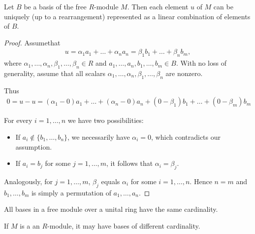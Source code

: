 \begin{proposition}\label{def:module_basis_decomposition}
  Let $B$ be a basis of the free $R$-module $M$. Then each element $u$ of $M$ can be uniquely (up to a rearrangement) represented as a linear combination of elements of $B$.
\end{proposition}
\begin{proof}
  Assume\LEM that
  \begin{align*}
    u = \alpha_1 a_1 + \ldots + \alpha_n a_n = \beta_1 b_1 + \ldots + \beta_n b_m,
  \end{align*}
  where $\alpha_1, \ldots, \alpha_n, \beta_1, \ldots, \beta_n \in R$ and $a_1, \ldots, a_n, b_1, \ldots, b_m \in B$. With no loss of generality, assume that all scalars $\alpha_1, \ldots, \alpha_n, \beta_1, \ldots, \beta_n$ are nonzero.

  Thus
  \begin{align*}
    0 = u - u = (\alpha_1 - 0) a_1 + \ldots + (\alpha_n - 0) a_n + (0 - \beta_1) b_1 + \ldots + (0 - \beta_m) b_m
  \end{align*}

  For every $i = 1, \ldots, n$ we have two possibilities:
  \begin{itemize}
    \item If $a_i \not\in \{ b_1, \ldots, b_n \}$, we necessarily have $\alpha_i = 0$, which contradicts our assumption.
    \item If $a_i = b_j$ for some $j = 1, \ldots, m$, it follows that $\alpha_i = \beta_j$.
  \end{itemize}

  Analogously, for $j = 1, \ldots, m$, $\beta_j$ equals $\alpha_i$ for some $i = 1, \ldots, n$. Hence $n = m$ and $b_1, \ldots, b_m$ is simply a permutation of $a_1, \ldots, a_n$.
\end{proof}

\begin{proposition}\label{thm:free_module_basis_cardinality}\cite{ProofWiki:bases_of_free_module_have_same_cardinality}
  All bases in a free module over a unital ring have the same cardinality.
\end{proposition}

\begin{example}\label{ex:free_module_with_non_equinumerous_bases}
  If $M$ is a an $R$-module, it may have bases of different cardinality.
\end{example}

